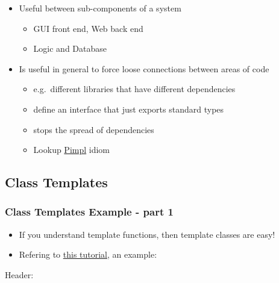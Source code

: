 \begin{itemize}
\tightlist
\item
  Useful between sub-components of a system

  \begin{itemize}
  \tightlist
  \item
    GUI front end, Web back end
  \item
    Logic and Database
  \end{itemize}
\item
  Is useful in general to force loose connections between areas of code

  \begin{itemize}
  \tightlist
  \item
    e.g.~different libraries that have different dependencies
  \item
    define an interface that just exports standard types
  \item
    stops the spread of dependencies
  \item
    Lookup \href{http://en.cppreference.com/w/cpp/language/pimpl}{Pimpl}
    idiom
  \end{itemize}
\end{itemize}

\hypertarget{class-templates}{%
\subsection{Class Templates}\label{class-templates}}

\hypertarget{class-templates-example---part-1}{%
\subsubsection{Class Templates Example - part
1}\label{class-templates-example---part-1}}

\begin{itemize}
\tightlist
\item
  If you understand template functions, then template classes are easy!
\item
  Refering to
  \href{http://www.cplusplus.com/doc/tutorial/templates/}{this
  tutorial}, an example:
\end{itemize}

Header:

\begin{Shaded}
\begin{Highlighting}[]
\NormalTok{ <}
\NormalTok{[}\NormalTok{];}

\NormalTok{:}
\NormalTok{;}
\NormalTok{\};}
\end{Highlighting}
\end{Shaded}

